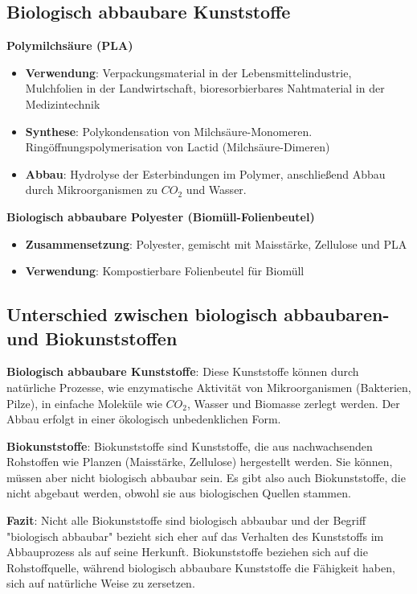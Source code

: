 \subsection{Biologisch abbaubare Kunststoffe}
\textbf{Polymilchsäure (PLA)}
\begin{itemize}
    \item \textbf{Verwendung}: Verpackungsmaterial in der Lebensmittelindustrie, Mulchfolien in der Landwirtschaft,
        bioresorbierbares Nahtmaterial in der Medizintechnik
    \item \textbf{Synthese}: Polykondensation von Milchsäure-Monomeren. \\
        Ringöffnungspolymerisation von Lactid (Milchsäure-Dimeren)
    \item \textbf{Abbau}: Hydrolyse der Esterbindungen im Polymer, anschließend Abbau durch Mikroorganismen zu $CO_2$ und Wasser.
\end{itemize}

\vspace{0.3cm}

\textbf{Biologisch abbaubare Polyester (Biomüll-Folienbeutel)}
\begin{itemize}
    \item \textbf{Zusammensetzung}: Polyester, gemischt mit Maisstärke, Zellulose und PLA
    \item \textbf{Verwendung}: Kompostierbare Folienbeutel für Biomüll
\end{itemize}

\vspace{0.3cm}

\subsection{Unterschied zwischen biologisch abbaubaren- und Biokunststoffen}

\textbf{Biologisch abbaubare Kunststoffe}: Diese Kunststoffe können durch natürliche Prozesse, wie enzymatische Aktivität von Mikroorganismen (Bakterien, Pilze), in einfache Moleküle wie $CO_2$, Wasser und Biomasse zerlegt werden. 
Der Abbau erfolgt in einer ökologisch unbedenklichen Form.

\textbf{Biokunststoffe}: Biokunststoffe sind Kunststoffe, die aus nachwachsenden Rohstoffen wie Planzen (Maisstärke, Zellulose) hergestellt werden.
Sie können, müssen aber nicht biologisch abbaubar sein. Es gibt also auch Biokunststoffe, die nicht abgebaut werden, obwohl sie aus biologischen Quellen stammen.

\textbf{Fazit}: Nicht alle Biokunststoffe sind biologisch abbaubar und der Begriff "biologisch abbaubar" bezieht sich eher auf das Verhalten des Kunststoffs im Abbauprozess als auf seine Herkunft. 
Biokunststoffe beziehen sich auf die Rohstoffquelle, während biologisch abbaubare Kunststoffe die Fähigkeit haben, sich auf natürliche Weise zu zersetzen.
